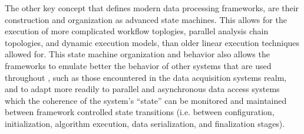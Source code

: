 \documentclass[../main-v1.tex]{subfiles}
\begin{document}





The other key concept that defines modern data processing frameworks, are their construction and organization as advanced state machines.  This allows for the execution of more complicated workflow toplogies, parallel analysis chain topologies, and dynamic execution models, than older linear execution techniques allowed for.  This state machine organization and behavior also allows the frameworks to emulate better the behavior of other systems that are used throughout  , such as those encountered in the data acquisition systems realm, and to adapt more readily to parallel and asynchronous data access systems which the coherence of the system's ``state'' can be monitored and maintained between framework controlled state transitions (i.e. between configuration, initialization, algorithm execution, data serialization, and finalization stages).  

\end{document}
